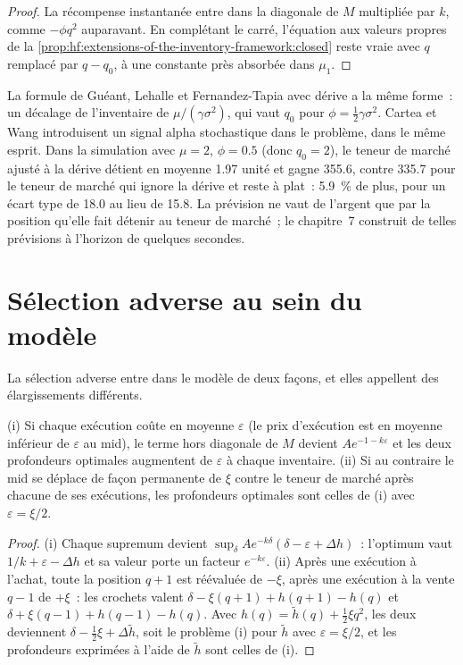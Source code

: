 \begin{proof}
La récompense instantanée entre dans la diagonale de $M$ multipliée par $k$, comme $-\phi q^2$ auparavant. En complétant le carré, l'équation aux valeurs propres de la
\cref{prop:hf:extensions-of-the-inventory-framework:closed} reste vraie avec $q$ remplacé par $q-q_0$, à une constante près absorbée dans $\mu_1$.
\end{proof}

La formule de Guéant, Lehalle et Fernandez-Tapia avec dérive a la même forme~: un décalage de l'inventaire de $\mu/(\gamma\sigma^2)$, qui vaut $q_0$ pour
$\phi=\tfrac12\gamma\sigma^2$. Cartea et Wang introduisent un signal alpha stochastique dans le problème, dans le même esprit. Dans la simulation avec $\mu=2$,
$\phi=0.5$ (donc $q_0=2$), le teneur de marché ajusté à la dérive détient en moyenne 1.97 unité et gagne 355.6, contre 335.7 pour le teneur de marché qui ignore la
dérive et reste à plat~: 5.9~\% de plus, pour un écart type de 18.0 au lieu de 15.8. La prévision ne vaut de l'argent que par la position qu'elle fait
détenir au teneur de marché~; le chapitre~7 construit de telles prévisions à l'horizon de quelques secondes.

\section{Sélection adverse au sein du modèle}

La sélection adverse entre dans le modèle de deux façons, et elles appellent des élargissements différents.

\begin{proposition}\label{prop:hf:extensions-of-the-inventory-framework:adverse}
(i) Si chaque exécution coûte en moyenne $\varepsilon$ (le prix d'exécution est en moyenne inférieur de $\varepsilon$ au mid), le terme hors diagonale de $M$ devient
$Ae^{-1-k\varepsilon}$ et les deux profondeurs optimales augmentent de $\varepsilon$ à chaque inventaire. (ii) Si au contraire le mid se déplace de façon permanente de $\xi$ contre
le teneur de marché après chacune de ses exécutions, les profondeurs optimales sont celles de (i) avec $\varepsilon=\xi/2$.
\end{proposition}

\begin{proof}
(i) Chaque supremum devient $\sup_\delta Ae^{-k\delta}(\delta-\varepsilon+\Delta h)$~: l'optimum vaut $1/k+\varepsilon-\Delta h$ et sa valeur porte un facteur
$e^{-k\varepsilon}$. (ii) Après une exécution à l'achat, toute la position $q+1$ est réévaluée de $-\xi$, après une exécution à la vente $q-1$ de $+\xi$~: les crochets valent
$\delta-\xi(q+1)+h(q+1)-h(q)$ et $\delta+\xi(q-1)+h(q-1)-h(q)$. Avec $h(q)=\tilde h(q)+\tfrac12\xi q^2$, les deux deviennent $\delta-\tfrac12\xi+\Delta\tilde
h$, soit le problème (i) pour $\tilde h$ avec $\varepsilon=\xi/2$, et les profondeurs exprimées à l'aide de $\tilde h$ sont celles de (i).
\end{proof}

